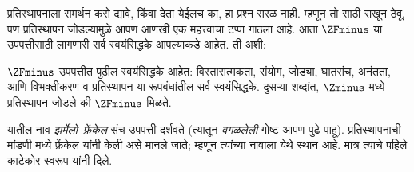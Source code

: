 \documentclass[../../../include/open-logic-section]{subfiles}
\begin{document}

प्रतिस्थापनाला समर्थन कसे द्यावे, किंवा देता येईलच का, हा प्रश्न सरळ नाही. म्हणून तो  साठी राखून ठेवू. पण प्रतिस्थापन जोडल्यामुळे आपण आणखी एक महत्त्वाचा टप्पा गाठला आहे. आता $\ZFminus$ या उपपत्तीसाठी लागणारी सर्व स्वयंसिद्धके आपल्याकडे आहेत. ती अशी:

\begin{defn}
$\ZFminus$ उपपत्तीत पुढील स्वयंसिद्धके आहेत: विस्तारात्मकता, संयोग, जोड्या, घातसंच, अनंतता, आणि विभक्तीकरण व प्रतिस्थापन या रूपबंधांतील सर्व स्वयंसिद्धके. दुसऱ्या शब्दांत, $\Zminus$ मध्ये प्रतिस्थापन जोडले की $\ZFminus$ मिळते.
\end{defn}
\noindent
यातील नाव \emph{झर्मेलो--फ्रेंकेल} संच उपपत्ती दर्शवते (त्यातून \emph{वगळलेली} गोष्ट आपण पुढे पाहू). प्रतिस्थापनाची मांडणी \citeyear{Fraenkel1922} मध्ये फ्रेंकेल यांनी केली असे मानले जाते; म्हणून त्यांच्या नावाला येथे स्थान आहे. मात्र त्याचे पहिले काटेकोर स्वरूप \citet{Skolem1922} यांनी दिले.
\end{document}
